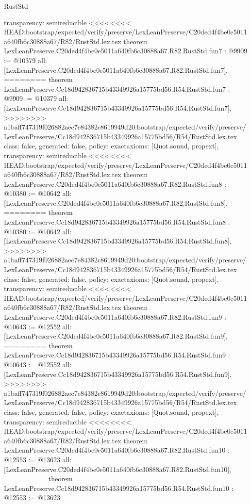 \begin{lexlean}{RustStd}
\begin{coremodule}
{\begin{coremodule}
{{{{{{{{{{  transparency: semireducible
}
<<<<<<<< HEAD:bootstrap/expected/verify/preserve/LexLeanPreserve/C20ded4f4be0e5011a640fb6c30888a67/R82/RustStd.lex.tex
theorem LexLeanPreserve.C20ded4f4be0e5011a640fb6c30888a67.R82.RustStd.fun7 : @9909 := @10379 {
  all: [LexLeanPreserve.C20ded4f4be0e5011a640fb6c30888a67.R82.RustStd.fun7],
========
theorem LexLeanPreserve.Cc18d942836715b43349926a15775bd56.R54.RustStd.fun7 : @9909 := @10379 {
  all: [LexLeanPreserve.Cc18d942836715b43349926a15775bd56.R54.RustStd.fun7],
>>>>>>>> a1baff747319f026882aec7e84382c8619949d20:bootstrap/expected/verify/preserve/LexLeanPreserve/Cc18d942836715b43349926a15775bd56/R54/RustStd.lex.tex
  class: false,
  generated: false,
  policy: exact{axioms: [Quot.sound, propext]},
  transparency: semireducible
}
<<<<<<<< HEAD:bootstrap/expected/verify/preserve/LexLeanPreserve/C20ded4f4be0e5011a640fb6c30888a67/R82/RustStd.lex.tex
theorem LexLeanPreserve.C20ded4f4be0e5011a640fb6c30888a67.R82.RustStd.fun8 : @10380 := @10642 {
  all: [LexLeanPreserve.C20ded4f4be0e5011a640fb6c30888a67.R82.RustStd.fun8],
========
theorem LexLeanPreserve.Cc18d942836715b43349926a15775bd56.R54.RustStd.fun8 : @10380 := @10642 {
  all: [LexLeanPreserve.Cc18d942836715b43349926a15775bd56.R54.RustStd.fun8],
>>>>>>>> a1baff747319f026882aec7e84382c8619949d20:bootstrap/expected/verify/preserve/LexLeanPreserve/Cc18d942836715b43349926a15775bd56/R54/RustStd.lex.tex
  class: false,
  generated: false,
  policy: exact{axioms: [Quot.sound, propext]},
  transparency: semireducible
}
<<<<<<<< HEAD:bootstrap/expected/verify/preserve/LexLeanPreserve/C20ded4f4be0e5011a640fb6c30888a67/R82/RustStd.lex.tex
theorem LexLeanPreserve.C20ded4f4be0e5011a640fb6c30888a67.R82.RustStd.fun9 : @10643 := @12552 {
  all: [LexLeanPreserve.C20ded4f4be0e5011a640fb6c30888a67.R82.RustStd.fun9],
========
theorem LexLeanPreserve.Cc18d942836715b43349926a15775bd56.R54.RustStd.fun9 : @10643 := @12552 {
  all: [LexLeanPreserve.Cc18d942836715b43349926a15775bd56.R54.RustStd.fun9],
>>>>>>>> a1baff747319f026882aec7e84382c8619949d20:bootstrap/expected/verify/preserve/LexLeanPreserve/Cc18d942836715b43349926a15775bd56/R54/RustStd.lex.tex
  class: false,
  generated: false,
  policy: exact{axioms: [Quot.sound, propext]},
  transparency: semireducible
}
<<<<<<<< HEAD:bootstrap/expected/verify/preserve/LexLeanPreserve/C20ded4f4be0e5011a640fb6c30888a67/R82/RustStd.lex.tex
theorem LexLeanPreserve.C20ded4f4be0e5011a640fb6c30888a67.R82.RustStd.fun10 : @12553 := @13623 {
  all: [LexLeanPreserve.C20ded4f4be0e5011a640fb6c30888a67.R82.RustStd.fun10],
========
theorem LexLeanPreserve.Cc18d942836715b43349926a15775bd56.R54.RustStd.fun10 : @12553 := @13623 {
}}}}}}}}}}}}}}
\end{coremodule}}
\end{coremodule}
\end{lexlean}
